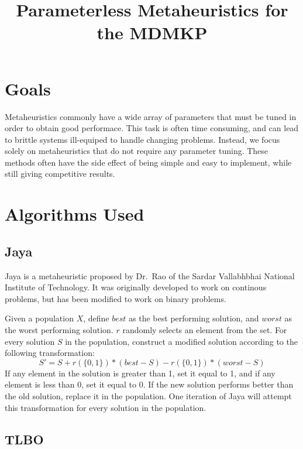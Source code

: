 \documentclass[11pt, letterpaper, onecolumn]{article}
\title{\textbf{Parameterless Metaheuristics for the MDMKP}}
\begin{document}
\maketitle

\section{Goals}

Metaheuristics commonly have a wide array of parameters that must be tuned in order to
obtain good performace. This task is often time consuming, and can lead to brittle systems
ill-equiped to handle changing problems. Instead, we focus solely on metaheuristics that
do not require any parameter tuning. These methods often have the side effect of being
simple and easy to implement, while still giving competitive results.

\section{Algorithms Used}

\subsection{Jaya}

Jaya is a metaheuristic proposed by Dr.~Rao of the Sardar Vallabhbhai National
Institute of Technology\cite{jaya}. It was originally developed to work on continous
problems, but has been modified to work on binary problems.

Given a population $X$, define $best$ as the best performing solution, and $worst$ as the worst performing solution. $r$ randomly selects an element from the set. For every solution $S$ in the population, construct a modified solution according to the following transformation:
\begin{equation} S' = S + r(\{0, 1\})*(best - S) - r(\{0, 1\})*(worst - S) \end{equation}
If any element in the solution is greater than 1, set it equal to 1, and if any element is less than 0, set it equal to 0. If the new solution performs better than the old solution, replace it in the population. One iteration of Jaya will attempt this transformation for every solution in the population. 

\subsection{TLBO }
\end{document}
